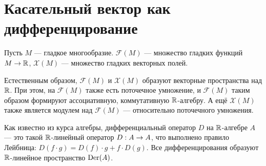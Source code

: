 \documentclass[a4paper]{report}
\begin{document}

    \section{Касательный вектор как дифференцирование}
    Пусть $M$ --- гладкое многообразие. $\mathscr{F}(M)$ --- множество гладких функций $M \rightarrow \mathbb{R}$, $\mathscr{X}(M)$ --- множество гладких векторных полей.

    Естественным образом, $\mathscr{F}(M)$ и $\mathscr{X}(M)$ образуют векторные пространства над $\mathbb{R}$.
    При этом, на $\mathscr{F}(M)$ также есть поточечное умножение, и $\mathscr{F}(M)$ таким образом формируют ассоциативную, коммутативную $\mathbb{R}$-алгебру.
    А ещё $\mathscr{X}(M)$ также является модулем над $\mathscr{F}(M)$ --- относительно поточечного умножения.

    Как известно из курса алгебры, дифференциальный оператор $D$ на $\mathbb{R}$-алгебре $A$ --- это такой $\mathbb{R}$-линейный оператор $D: A \rightarrow A$, что выполнено правило Лейбница: $D(f \cdot g) = D(f) \cdot g + f \cdot D(g)$.
    Все дифференцирования образуют $\mathbb{R}$-линейное пространство $\operatorname{Der}(A)$.
\end{document}
